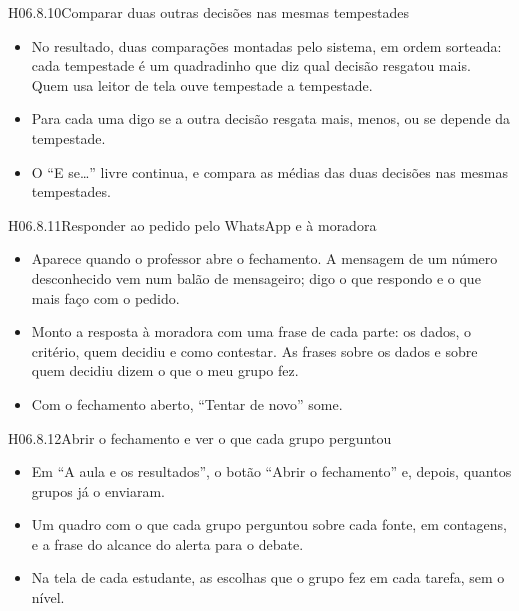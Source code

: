 \begin{historia}{H06.8.10}{Comparar duas outras decisões nas mesmas tempestades}{\pronto}
\aceite
\begin{itemize}
  \item No resultado, duas comparações montadas pelo sistema, em ordem
    sorteada: cada tempestade é um quadradinho que diz qual decisão resgatou
    mais. Quem usa leitor de tela ouve tempestade a tempestade.
  \item Para cada uma digo se a outra decisão resgata mais, menos, ou se
    depende da tempestade.
  \item O \enquote{E se\ldots} livre continua, e compara as médias das duas
    decisões nas mesmas tempestades.
\end{itemize}
\end{historia}

\begin{historia}{H06.8.11}{Responder ao pedido pelo WhatsApp e à moradora}{\pronto}
\aceite
\begin{itemize}
  \item Aparece quando o professor abre o fechamento. A mensagem de um número
    desconhecido vem num balão de mensageiro; digo o que respondo e o que mais
    faço com o pedido.
  \item Monto a resposta à moradora com uma frase de cada parte: os dados, o
    critério, quem decidiu e como contestar. As frases sobre os dados e sobre
    quem decidiu dizem o que o meu grupo fez.
  \item Com o fechamento aberto, \enquote{Tentar de novo} some.
\end{itemize}
\end{historia}

\begin{historia}{H06.8.12}{Abrir o fechamento e ver o que cada grupo perguntou}{\pronto}
\aceite
\begin{itemize}
  \item Em \enquote{A aula e os resultados}, o botão \enquote{Abrir o
    fechamento} e, depois, quantos grupos já o enviaram.
  \item Um quadro com o que cada grupo perguntou sobre cada fonte, em
    contagens, e a frase do alcance do alerta para o debate.
  \item Na tela de cada estudante, as escolhas que o grupo fez em cada tarefa,
    sem o nível.
\end{itemize}
\end{historia}

